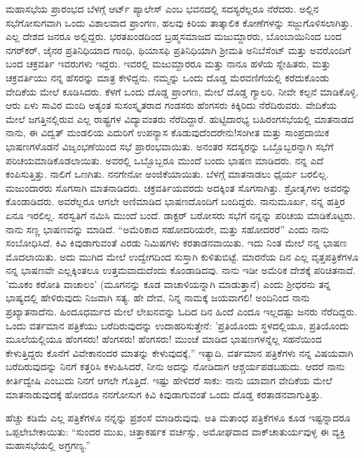 ಮಹಾಸಭೆಯ ಪ್ರಾರಂಭದ ಬೆಳಗ್ಗೆ ಆರ್ಟ್ ಪ್ಯಾಲೇಸ್ ಎಂಬ ಭವನದಲ್ಲಿ ಸದಸ್ಯರೆಲ್ಲರೂ ನೆರೆದರು. ಅಲ್ಲಿನ ಸಭೆಗೋಸುಗವಾಗಿ ಒಂದು ವಿಶಾಲವಾದ ಪ್ರಾಂಗಣ, ಹಲವು ಕಿರಿಯ ತಾತ್ಕಾಲಿಕ ಕೋಣೆಗಳನ್ನು ಸಜ್ಜುಗೊಳಿಸಲಾಗಿತ್ತು. ಎಲ್ಲ ದೇಶದ ಜನರೂ ಅಲ್ಲಿದ್ದರು. ಭರತಖಂಡದಿಂದ ಬ್ರಹ್ಮಸಮಾಜದ ಮಜುಮ್ದಾರರು, ಬೊಂಬಾಯಿನಿಂದ ಬಂದ ನಗರ್‌ಕರ್‌, ಜೈನರ ಪ್ರತಿನಿಧಿಯಾದ ಗಾಂಧಿ, ಥಿಯಾಸಫಿ ಪ್ರತಿನಿಧಿಯಾಗಿ ಶ‍್ರೀಮತಿ ಅನಿಬೆಸೆಂಟ್  ಮತ್ತು ಅವರೊಂದಿಗೆ ಬಂದ ಚಕ್ರವರ್ತಿ ಇವರುಗಳು ಇದ್ದರು. ಇವರಲ್ಲಿ ಮಜುಮ್ದಾರರೂ ಮತ್ತು ನಾನೂ ಹಳೆಯ ಸ್ನೇಹಿತರು, ಮತ್ತು ಚಕ್ರವರ್ತಿಯು ನನ್ನ ಹೆಸರನ್ನು ಮಾತ್ರ ಕೇಳಿದ್ದನು. ನಮ್ಮನ್ನು ಒಂದು ದೊಡ್ಡ ಮೆರವಣಿಗೆಯಲ್ಲಿ ಕರೆದುಕೊಂಡು ವೇದಿಕೆಯ ಮೇಲೆ ಕೂಡಿಸಿದರು. ಕೆಳಗೆ ಒಂದು ದೊಡ್ಡ ಪ್ರಾಂಗಣ, ಮೇಲೆ ದೊಡ್ಡ ಗ್ಯಾಲರಿ. ನೀವೇ ಕಲ್ಪನೆ ಮಾಡಿಕೊಳ್ಳಿ. ಆರು ಏಳು ಸಾವಿರ ಮಂದಿ ಅತ್ಯಂತ ಸುಸಂಸ್ಕೃತರಾದ ಗಂಡಸರು ಹೆಂಗಸರು ಕಿಕ್ಕಿರಿದು ನೆರೆದಿರುವರು. ವೇದಿಕೆಯ ಮೇಲೆ ಜಗತ್ತಿನಲ್ಲಿರುವ ಎಲ್ಲ ರಾಷ್ಟ್ರಗಳ ವಿದ್ಯಾವಂತರು ನೆರೆದಿದ್ದಾರೆ. ಹುಟ್ಟಿದಾರಭ್ಯ ಬಹಿರಂಗಸಭೆಯಲ್ಲಿ ಮಾತನಾಡದ ನಾನು, ಈ ವಿದ್ವತ್ ಮಂಡಲಿಯ ಎದುರಿಗೆ ಉಪನ್ಯಾಸ ಕೊಡುವುದೆಂದರೇನು!ಸಂಗೀತ ಮತ್ತು ಸಾಂಪ್ರದಾಯಿಕ ಭಾಷಣಗಳೊಡನೆ ವಿಜೃಂಭಣೆಯಿಂದ ಸಭೆ ಪ್ರಾರಂಭವಾಯಿತು. ಅನಂತರ ಸದಸ್ಯರನ್ನು ಒಬ್ಬೊಬ್ಬರನ್ನಾಗಿ ಸಭೆಗೆ ಪರಿಚಯಮಾಡಿಕೊಡಲಾಯಿತು. ಅವರಲ್ಲಿ ಒಬ್ಬೊಬ್ಬರೂ ಮುಂದೆ ಬಂದು ಭಾಷಣ ಮಾಡಿದರು. ನನ್ನ ಎದೆ ಕಂಪಿಸುತ್ತಿತ್ತು. ನಾಲಿಗೆ ಒಣಗಿತು. ನನಗೇನೋ ಅಂಜಿಕೆಯಾಯಿತು. ಬೆಳಗ್ಗೆ ಮಾತನಾಡಲು ಧೈರ್ಯ ಬರಲಿಲ್ಲ. ಮಜುಂದಾರರು ಸೊಗಸಾಗಿ ಮಾತನಾಡಿದರು. ಚಕ್ರವರ್ತಿಯವರದು ಅದಕ್ಕಿಂತ ಸೊಗಸಾಗಿತ್ತು. ಶ್ರೋತೃಗಳು ಅವರನ್ನು ಕೊಂಡಾಡಿದರು. ಅವರೆಲ್ಲರೂ ಆಗಲೇ ಅಣಿಮಾಡಿದ ಭಾಷಣದೊಂದಿಗೆ ಬಂದಿದ್ದರು. ನಾನುಮೂರ್ಖ, ನನ್ನ ಹತ್ತಿರ ಏನೂ ಇರಲಿಲ್ಲ. ಸರಸ್ವತಿಗೆ ನಮಿಸಿ ಮುಂದೆ ಬಂದೆ. ಡಾಕ್ಟರ್ ಬರೋಸರು ಸಭೆಗೆ ನನ್ನನ್ನು ಪರಿಚಯ ಮಾಡಿಕೊಟ್ಟರು. ನಾನು ಸಣ್ಣ ಭಾಷಣವನ್ನು ಮಾಡಿದೆ. “ಅಮೆರಿಕಾದ ಸಹೋದರಿಯರೇ, ಮತ್ತು ಸಹೋದರರೆ” ಎಂದು ನಾನು ಸಂಬೋಧಿಸಿದೆ. ಕಿವಿ ಕಿವುಡಾಗುವಂತೆ ಎರಡು ನಿಮಿಷಗಳು ಕರತಾಡನವಾಯಿತು. ಇದು ನಿಂತ ಮೇಲೆ ನನ್ನ ಭಾಷಣ ಮೊದಲಾಯಿತು. ಅದು ಮುಗಿದ ಮೇಲೆ ಉದ್ವೇಗದಿಂದ ಸುಸ್ತಾಗಿ ಕುಳಿತುಬಿಟ್ಟೆ. ಮಾರನೆಯ ದಿನ ಎಲ್ಲ ವೃತ್ತಪತ್ರಿಕೆಗಳೂ ನನ್ನ ಭಾಷಣವೇ ಎಲ್ಲಕ್ಕಿಂತಲೂ ಉತ್ತಮವಾದುದೆಂದು ಕೊಂಡಾಡಿದವು. ನಾನು ಇಡೀ ಅಮೆರಿಕ ದೇಶಕ್ಕೆ ಪರಿಚಿತನಾದೆ. ’ಮೂಕಂ ಕರೋತಿ ವಾಚಾಲಂ’ (ಮೂಗನನ್ನು ಕೂಡ ವಾಚಾಳಿಯನ್ನಾಗಿ ಮಾಡುತ್ತಾನೆ) ಎಂದು ಶ‍್ರೀಧರನು ತನ್ನ ಭಾಷ್ಯದಲ್ಲಿ ಹೇಳಿರುವುದು ನಿಜವಾಗಿ ಸತ್ಯ. ಹೇ ದೇವ, ನಿನ್ನ ನಾಮಕ್ಕೆ ಜಯವಾಗಲಿ! ಅಂದಿನಿಂದ ನಾನು ಪ್ರಖ್ಯಾತನಾದೆನು. ಹಿಂದೂಧರ್ಮದ ಮೇಲೆ ಲೇಖನವನ್ನು ಓದಿದ ದಿನ ಹಿಂದೆ ಎಂದೂ ಇಲ್ಲದಷ್ಟು ಜನರು ನೆರೆದಿದ್ದರು. ಒಂದು ವರ್ತಮಾನ ಪತ್ರಿಕೆಯು ಬರೆದಿರುವುದನ್ನು ಉದಾಹರಿಸುತ್ತೇನೆ: ’ಪ್ರತಿಯೊಂದು ಸ್ಥಳದಲ್ಲಿಯೂ, ಪ್ರತಿಯೊಂದು ಮೂಲೆಯಲ್ಲಿಯೂ ಹೆಂಗಸರು! ಹೆಂಗಸರು! ಹೆಂಗಸರು! ಮುಂಚೆ ಮಾಡಿದ ಭಾಷಣಗಳನ್ನೆಲ್ಲ ಸಹನೆಯಿಂದ ಕೇಳುತ್ತಿದ್ದರು \enginline{-} ಕೊನೆಗೆ ವಿವೇಕಾನಂದರ ಮಾತನ್ನು ಕೇಳುವುದಕ್ಕೆ,” ಇತ್ಯಾದಿ. ವರ್ತಮಾನ ಪತ್ರಿಕೆಗಳು ನನ್ನ ವಿಷಯವಾಗಿ ಬರೆದಿರುವುದನ್ನು ನಿನಗೆ ಕತ್ತರಿಸಿ ಕಳುಹಿಸಿದರೆ, ನೀನು ಅದನ್ನು ನೋಡಿದಾಗ ಆಶ್ಚರ್ಯಪಡಬಹುದು. ಆದರೆ ನಾನು ಕೀರ್ತಿದ್ವೇಷಿ ಎಂಬುದು ನಿನಗೆ ಆಗಲೇ ಗೊತ್ತಿದೆ. ಇಷ್ಟು ಹೇಳಿದರೆ ಸಾಕು: ನಾನು ಯಾವಾಗ ವೇದಿಕೆಯ ಮೇಲೆ ಮಾತನಾಡುವುದಕ್ಕೆ ಹೋದರೂ ನನಗೋಸುಗ ಕಿವಿ ಕಿವುಡಾಗುವಂತೆ ಒಂದು ದೊಡ್ಡ ಕರತಾಡನವಾಗುತ್ತಿತ್ತು.

ಹೆಚ್ಚು ಕಡಿಮೆ ಎಲ್ಲ ಪತ್ರಿಕೆಗಳೂ ನನ್ನನ್ನು ಪ್ರಶಂಸೆ ಮಾಡಿರುವುವು. ಅತಿ ಮತಾಂಧ ಪತ್ರಿಕೆಗಳೂ ಕೂಡ ಇಷ್ಟನ್ನಾದರೂ ಒಪ್ಪಲೇಬೇಕಾಯಿತು: “ಸುಂದರ ಮುಖ, ಚಿತ್ತಾಕರ್ಷಕ ವರ್ಚಸ್ಸು, ಅಮೋಘವಾದ ವಾಕ್‌ಚಾತುರ್ಯವುಳ್ಳ ಈ ವ್ಯಕ್ತಿ ಮಹಾಸಭೆಯಲ್ಲಿ ಅಗ್ರಗಣ್ಯ.”

